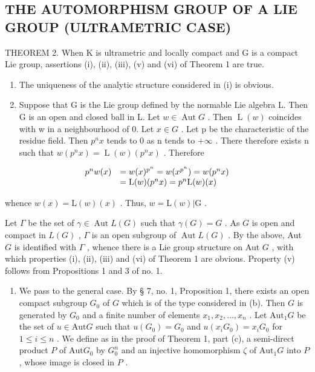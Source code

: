 \subsection{THE AUTOMORPHISM GROUP OF A LIE GROUP (ULTRAMETRIC CASE)}

THEOREM 2. When K is ultrametric and locally compact and G is a compact Lie group, assertions (i), (ii), (iii), (v) and (vi) of Theorem 1 are true.

\begin{enumerate}
\def\labelenumi{(\alph{enumi})}
\item
  The uniqueness of the analytic structure considered in (i) is obvious.
\item
  Suppose that G is the Lie group defined by the normable Lie algebra L. Then G is an open and closed ball in L. Let \(w \in \operatorname{Aut} G\) . Then \(\operatorname{L}(w)\) coincides with w in a neighbourhood of 0. Let \(x \in G\) . Let p be the characteristic of the residue field. Then \(p^{n}x\) tends to 0 as n tends to \(+\infty\) . There therefore exists n such that \(w(p^{n}x) = \operatorname{L}(w)(p^{n}x)\) . Therefore
\end{enumerate}

\[
\begin{array}{r l} p ^ {n} w (x) & = w (x) ^ {p ^ {n}} = w (x ^ {p ^ {n}}) = w (p ^ {n} x) \\ & = \mathrm{L} (w) (p ^ {n} x) = p ^ {n} \mathrm{L} (w) (x) \end{array}
\]

whence \(w(x) = \mathrm{L}(w)(x)\) . Thus, \(w = \mathrm{L}(w)|\mathrm{G}\) .

Let \(\Gamma\) be the set of \(\gamma \in \operatorname{Aut} L(G)\) such that \(\gamma(G) = G\) . As \(G\) is open and compact in \(L(G)\) , \(\Gamma\) is an open subgroup of \(\operatorname{Aut} L(G)\) . By the above, Aut \(G\) is identified with \(\Gamma\) , whence there is a Lie group structure on Aut \(G\) , with which properties (i), (ii), (iii) and (vi) of Theorem 1 are obvious. Property (v) follows from Propositions 1 and 3 of no. 1.

\begin{enumerate}
\def\labelenumi{(\alph{enumi})}
\setcounter{enumi}{2}
\tightlist
\item
  We pass to the general case. By § 7, no. 1, Proposition 1, there exists an open compact subgroup \(G_0\) of \(G\) which is of the type considered in (b). Then \(G\) is generated by \(G_0\) and a finite number of elements \(x_1, x_2, \ldots, x_n\) . Let \(\text{Aut}_1G\) be the set of \(u \in \text{Aut}G\) such that \(u(G_0) = G_0\) and \(u(x_iG_0) = x_iG_0\) for \(1 \leqslant i \leqslant n\) . We define as in the proof of Theorem 1, part (c), a semi-direct product \(P\) of \(\text{Aut}G_0\) by \(G_0^n\) and an injective homomorphism \(\zeta\) of \(\text{Aut}_1G\) into \(P\) , whose image is closed in \(P\) .
\end{enumerate}

